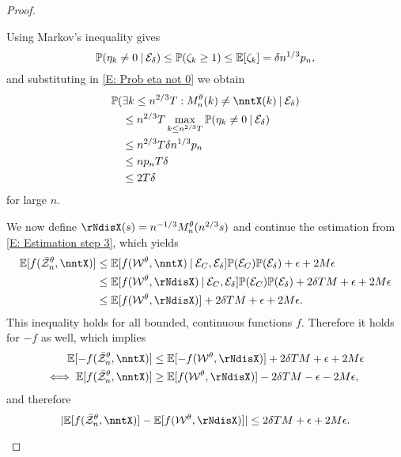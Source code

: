 \begin{proof}
\begin{proofpart}
Using Markov's inequality gives
\begin{equation}
\mathbb{P}( \eta_k \neq 0 \: | \: \mathcal{E}_{\delta} ) \leq \mathbb{P}( \zeta_k \geq 1 ) \leq \mathbb{E}[\zeta_k] = \delta n^{1 / 3}p_n,
\end{equation}
and substituting in \eqref{E: Prob eta not 0} we obtain
\begin{equation}
\begin{aligned}
&\Prob(\exists k\leq \n{2}{3}T: \Ndis(k) \neq \nntX(k) \cond \Event{\delta}) \\
&\quad \leq \n{2}{3}T \max_{k \leq \n{2}{3}T} \Prob( \eta_k \neq 0 \cond \Event{\delta} ) \\
&\quad \leq \n{2}{3}T\delta\n{1}{3}\p \\
&\quad \leq n \p T \delta \\
&\quad \leq 2T\delta 
\end{aligned}
\end{equation}
for large $n$.

We now define $\rNdisX(s) = \n{-1}{3} \Ndis(\n{2}{3}s)$ and continue the estimation from \eqref{E: Estimation step 3},
which yields
\begin{equation} \label{E: Estimation step 4}
\begin{aligned}
\Exp{f(\rzntX, \nntX)} 
&\leq \Exp{f(\WtX, \nntX) \cond \Event{C}, \Event{\delta}} \Prob(\Event{C}) \Prob(\Event{\delta}) + \epsilon + 2M\epsilon   \\
&\leq \Exp{f(\WtX, \rNdisX) \cond \Event{C}, \Event{\delta}} \Prob(\Event{C}) \Prob(\Event{\delta}) + 2\delta T M + \epsilon  + 2M\epsilon \\
&\leq \Exp{f(\WtX, \rNdisX)} + 2\delta T M + \epsilon  + 2M\epsilon.
\end{aligned}
\end{equation}
This inequality holds for all bounded, continuous functions $f$. 
Therefore it holds for $-f$ as well, which implies
\begin{equation}
\begin{aligned}
\Exp{-f(\rzntX, \nntX)} &\leq \Exp{-f(\WtX, \rNdisX) }+ 2\delta T M  + \epsilon + 2M\epsilon \\
\iff  \Exp{f(\rzntX, \nntX)} &\geq \Exp{f(\WtX, \rNdisX) } - 2\delta T M  - \epsilon - 2M\epsilon,
\end{aligned}
\end{equation}
and therefore
\begin{equation} \label{E: Equality of Expectations}
	|\Exp{f(\rzntX, \nntX)} - \Exp{f(\WtX, \rNdisX)} | \leq 2\delta T M + \epsilon  + 2M\epsilon.
\end{equation}
\end{proofpart}




\end{proof}
